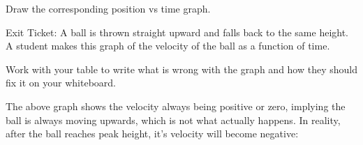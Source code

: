 \documentclass[../main-physics-problems.tex]{subfiles}
\begin{document}
\begin{questions}
Draw the corresponding position vs time graph.

\begin{solution}
\begin{center}
\end{center}    
\end{solution}

\question 
Exit Ticket: A ball is thrown straight upward and falls back to the same height. A student makes this graph of the velocity of the ball as a function of time. 

\begin{center}
\end{center}

Work with your table to write what is wrong with the graph and how they should fix it on your whiteboard.

\begin{solution}
    The above graph shows the velocity always being positive or zero, implying the ball is always moving upwards, which is not what actually happens. In reality, after the ball reaches peak height, it's velocity will become negative:

    \begin{center}
    \end{center}    
\end{solution}

\clearpage
\begin{EnvUplevel}

\end{EnvUplevel}
\end{questions}
\end{document}
